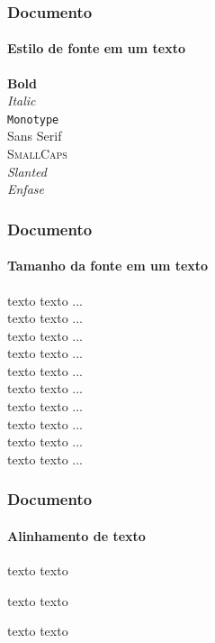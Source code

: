 \begin{frame}[fragile]
\frametitle{Documento}
\framesubtitle{Estilo de fonte em um texto}
\begin{LTXexample}
  \textbf{Bold} \\
  \textit{Italic} \\
  \texttt{Monotype} \\
  \textsf{Sans Serif} \\
  \textsc{SmallCaps} \\
  \textsl{Slanted} \\
  \emph{Enfase}
\end{LTXexample}
\end{frame}


\begin{frame}[fragile]
\frametitle{Documento}
\framesubtitle{Tamanho da fonte em um texto}
\begin{LTXexample}
  {\tiny texto texto ...} \\
  {\scriptsize texto texto ...} \\
  {\footnotesize texto texto ...} \\
  {\small texto texto ...} \\
  {\normalsize texto texto ...} \\
  {\large texto texto ...} \\
  {\Large texto texto ...} \\
  {\LARGE texto texto ...} \\
  {\huge texto texto ...} \\
  {\Huge texto texto ...}
\end{LTXexample}
\end{frame}

\begin{frame}[fragile]
\frametitle{Documento}
\framesubtitle{Alinhamento de texto}
\begin{LTXexample}
  \begin{center}
  texto texto
  \end{center}
  \begin{flushleft}
  texto texto
  \end{flushleft}
  \begin{flushright}
  texto texto
  \end{flushright}
\end{LTXexample}
\end{frame}

